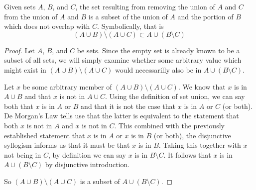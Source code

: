 \documentclass[main.tex]{subfiles}
\begin{document}
\begin{thm}
	Given sets \(A\), \(B\), and \(C\), the set resulting from removing the
	union of \(A\) and \(C\) from the union of \(A\) and \(B\) is a subset
	of the union of \(A\) and the portion of \(B\) which does not overlap
	with \(C\). Symbolically, that is
	\[(A \cup B) \setminus (A \cup C) \subset A \cup (B \setminus C)\]
\end{thm}
\begin{proof}
	Let \(A\), \(B\), and \(C\) be sets. Since the empty set is already
	known to be a subset of all sets, we will simply examine whether some
	arbitrary value which might exist in \((A \cup B) \setminus (A \cup C)\)
	would necessarilly also be in \(A \cup (B \setminus C)\).

	Let \(x\) be some arbitrary member of
	\((A \cup B) \setminus (A \cup C)\). We know that \(x\) is in
	\(A \cup B\) and that \(x\) is not in \(A \cup C\). Using the definition
	of set union, we can say both that \(x\) is in \(A\) or \(B\) and that
	it is not the case that \(x\) is in \(A\) or \(C\) (or both). De
	Morgan's Law tells use that the latter is equivalent to the statement
	that both \(x\) is not in \(A\) and \(x\) is not in \(C\). This combined
	with the previously established statement that \(x\) is in \(A\) or
	\(x\) is in \(B\) (or both), the disjunctive syllogism informs us that
	it must be that \(x\) is in \(B\). Taking this together with \(x\) not
	being in \(C\), by definition we can say \(x\) is in \(B \setminus C\).
	It follows that \(x\) is in \(A \cup (B \setminus C)\) by disjunctive
	introduction.

	So \((A \cup B) \setminus (A \cup C)\) is a subset of
	\(A \cup (B \setminus C)\).
\end{proof}
\end{document}
